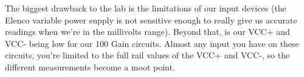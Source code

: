 \documentclass[%
 aip,
 jmp,
 amsmath,
 amssymb,
 reprint,%
 numerical,
 longbibliography,
]{revtex4-1}
\begin{document}
The biggest drawback to the lab is the limitations of our input devices (the Elenco variable power supply is not sensitive enough to really give us accurate readings when we're
in the millivolts range). Beyond that, is our VCC+ and VCC- being low for our 100 Gain circuits. Almost any input you have on these circuits, you're limited to the full rail values
of the VCC+ and VCC-, so the different measurements become a moot point.
\end{document}
